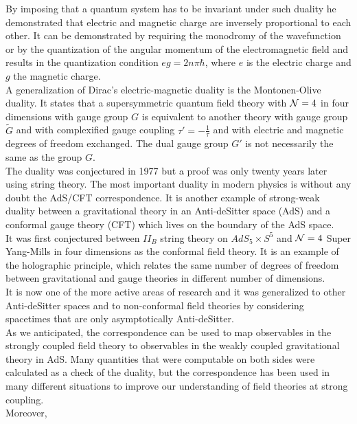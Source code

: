 By imposing that a quantum system has to be invariant under such duality he demonstrated that electric and magnetic charge are inversely proportional to each other. 
It can be demonstrated by requiring the monodromy of the wavefunction or by the quantization of the angular momentum of the electromagnetic field and results in the quantization condition $e g =  2 n \pi \hbar$, where $e$ is the electric charge and $g$ the magnetic charge.\\
A generalization of Dirac's electric-magnetic duality is the Montonen-Olive duality.
It states that a supersymmetric quantum field theory with $\mathcal{N}=4$ in four dimensions with gauge group $G$ is equivalent to another theory with gauge group $\tilde{G}$ and with complexified gauge coupling $\tau' = - \frac{1}{\tau}$ and with electric and magnetic degrees of freedom exchanged.
The dual gauge group $G'$ is not necessarily the same as the group $G$.\\
The duality was conjectured in 1977 but a proof was only twenty years later using string theory.
The most important duality in modern physics is without any doubt the AdS/CFT correspondence. 
It is another example of strong-weak duality between a gravitational theory in an Anti-deSitter space (AdS) and a conformal gauge theory (CFT) which lives on the boundary of the AdS space. \\
It was first conjectured between $II_B$ string theory on $AdS_5 \times S^5$ and $\mathcal{N}=4$ Super Yang-Mills in four dimensions as the conformal field theory. 
It is an example of the holographic principle, which relates the same number of degrees of freedom between gravitational and gauge theories in different number of dimensions.\\
It is now one of the more active areas of research and it was generalized to other Anti-deSitter spaces and to non-conformal field theories by considering spacetimes that are only asymptotically Anti-deSitter.\\
As we anticipated, the correspondence can be used to map observables in the strongly coupled field theory to observables in the weakly coupled gravitational theory in AdS.
Many quantities that were computable on both sides were calculated as a check of the duality, but the correspondence has been used in many different situations to improve our understanding of field theories at strong coupling.\\ 
Moreover, 




